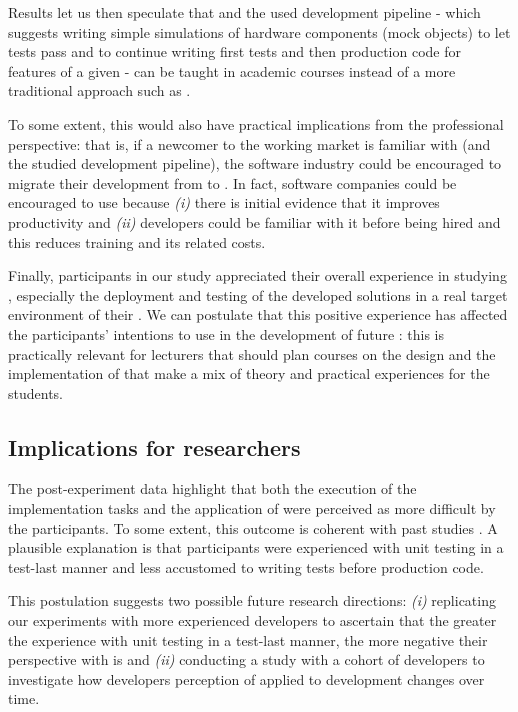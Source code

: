 Results let us then speculate that \tdd and the used development pipeline \cite{TDDEC} - which suggests writing simple simulations of hardware components (mock objects) to let tests pass and to continue writing first tests and then production code for features of a given \es - can be taught in academic \es courses instead of a more traditional approach such as \notdd.

To some extent, this would also have practical implications from the professional perspective: that is, if a newcomer to the working market is familiar with \tdd (and the studied development pipeline), the software industry could be encouraged to migrate their development from \notdd to \tdd. In fact, software companies could be encouraged to use \tdd because \textit{(i)} there is initial evidence that it improves productivity and \textit{(ii)} developers could be familiar with it before being hired and this reduces training and its related costs.

Finally, participants in our study appreciated their overall experience in studying \tdd, especially the deployment and testing of the developed solutions in a real target environment of their \es. 
We can postulate that this positive experience has affected the participants' intentions to use \tdd in the development of future \ess: this is practically relevant for lecturers that should plan courses on the design and the implementation of \ess that make a mix of theory and practical experiences for the students.

\subsection{Implications for researchers} 
The post-experiment data highlight that both the execution of the implementation tasks and the application of \tdd were perceived as more difficult by the participants. 
To some extent, this outcome is coherent with past studies \eg \cite{DBLP:conf/xpu/0001SBFC20, DBLP:conf/esem/RomanoZBPS22}. 
A plausible explanation is that participants were experienced with unit testing in a test-last manner and less accustomed to writing tests before production code. 

This postulation suggests two possible future research directions: \textit{(i)} replicating our experiments  with more experienced developers to ascertain that the greater the experience with unit testing in a test-last manner, the more negative their perspective with \tdd is and \textit{(ii)} conducting a study with a cohort of developers to investigate how developers perception of \tdd applied to \es development changes over time.

